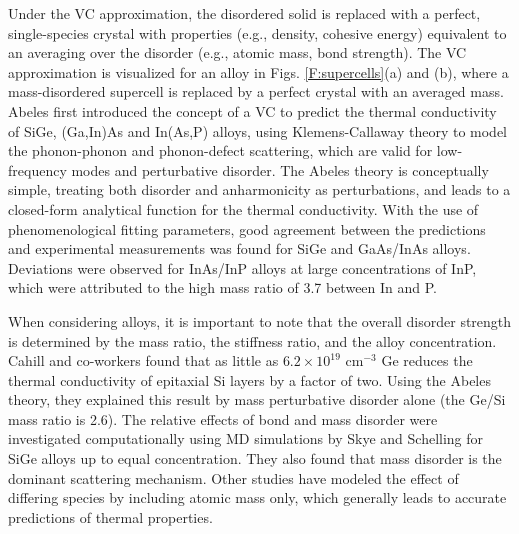 \documentclass[aps,prb,onecolumn,preprint,footinbib,superscriptaddress,amsmath,amssymb,floatfix]{revtex4}
\begin{document}
Under the VC approximation, the disordered solid is replaced with 
a perfect, single-species crystal with properties (e.g., density, 
cohesive energy) equivalent to an averaging over the disorder 
(e.g., atomic mass, bond strength).\cite{abeles_lattice_1963}
The VC approximation is visualized for an alloy in Figs. 
\ref{F:supercells}(a) and (b), where 
a mass-disordered supercell is replaced by a perfect 
crystal with an averaged mass. 
Abeles first introduced the concept of a VC to predict the
thermal conductivity of SiGe, (Ga,In)As and In(As,P) alloys,
\cite{abeles_lattice_1963} using  
Klemens-Callaway theory to model the phonon-phonon and phonon-defect 
scattering, 
which are valid for low-frequency modes and  
perturbative disorder.
\cite{abeles_lattice_1963,klemens_scattering_1955,
klemens_thermal_1957,callaway_model_1959,mattis_phonon_1957,
kamitakahara_vibrations_1974} 
The Abeles theory is conceptually simple, treating both
disorder and anharmonicity as perturbations, and leads to 
a closed-form analytical function for the thermal conductivity.
With the use of phenomenological  
fitting parameters, good agreement between the predictions and 
experimental measurements 
was found for SiGe and GaAs/InAs alloys. Deviations were observed 
for InAs/InP alloys at large concentrations of 
InP, which were attributed to the high mass ratio of 3.7 between 
In and P.\cite{abeles_lattice_1963}

When considering alloys, it is important to note that 
the overall disorder strength is determined by the mass ratio, 
the stiffness ratio, and the alloy concentration.
Cahill and co-workers found that as little as 
$6.2\times10^{19}$ cm$^{-3}$ Ge reduces the thermal conductivity of 
epitaxial Si layers by a factor of two.\cite{cahill_thermal_2004}  
Using the Abeles theory, they explained this result 
by mass perturbative disorder alone (the Ge/Si mass ratio is 2.6).
\cite{cahill_thermal_2004,cahill_thermal_2005} 
The relative effects of bond and mass disorder were investigated 
computationally using MD simulations by Skye and 
Schelling for SiGe alloys up to equal concentration.
\cite{skye_thermal_2008} They also found that mass disorder is 
the dominant scattering mechanism. Other studies have modeled the 
effect of differing species by including 
atomic mass only, which generally leads to accurate predictions 
of thermal properties.
\cite{landry_complex_2008,landry_thermal_2009,tian_enhancing_2012}
\end{document}
